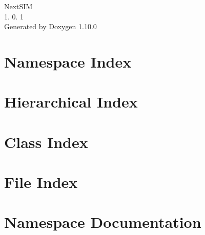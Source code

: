 \documentclass[twoside]{book}
\newcommand{\+}{\discretionary{\mbox{\scriptsize$\hookleftarrow$}}{}{}}
\newcommand{\clearemptydoublepage}{%
    \newpage{\pagestyle{empty}\cleardoublepage}%
  }
\begin{document}
  \raggedbottom
    \hypersetup{pageanchor=false,
                bookmarksnumbered=true,
                pdfencoding=unicode
               }
  \begin{titlepage}
  \vspace*{7cm}
  \begin{center}%
  {\Large Next\+SIM}\\
  [1ex]\large 1. 0. 1 \\
  \vspace*{1cm}
  {\large Generated by Doxygen 1.10.0}\\
  \end{center}
  \end{titlepage}
  \clearemptydoublepage
  \tableofcontents
  \clearemptydoublepage
  \hypersetup{pageanchor=true}


\chapter{Namespace Index}

\chapter{Hierarchical Index}

\chapter{Class Index}

\chapter{File Index}

\chapter{Namespace Documentation}














\end{document}
